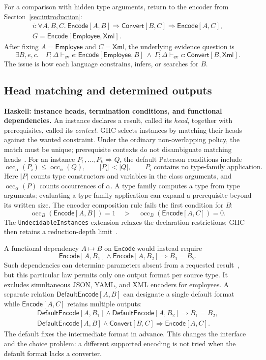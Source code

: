 \documentclass[10pt,a4paper]{article}
\newcommand{\Pj}[2]{\Gamma;\Delta\vdash_{\mathrm{ev}} #1:#2}
\newcommand{\kw}[1]{\mathsf{#1}}
\begin{document}
For a comparison with hidden type arguments, return to the encoder from
Section~\ref{sec:introduction}:
\[
\begin{gathered}
 i:\forall A,B,C.\ \kw{Encode}[A,B]\Rightarrow\kw{Convert}[B,C]
                    \Rightarrow\kw{Encode}[A,C],\\
 G=\kw{Encode}[\kw{Employee},\kw{Xml}].
\end{gathered}
\]
After fixing $A=\kw{Employee}$ and $C=\kw{Xml}$, the underlying evidence question is
\[
 \boxed{\exists B,e,c.\quad
 \Pj e{\kw{Encode}[\kw{Employee},B]}\ \land\ \Pj c{\kw{Convert}[B,\kw{Xml}]}.}
\]
The issue is how each language constrains, infers, or searches for $B$.

\subsection{Head matching and determined outputs}
\textbf{Haskell: instance heads, termination conditions, and functional dependencies.}
An instance declares a result, called its \emph{head}, together with prerequisites,
called its \emph{context}.
GHC selects instances by matching their heads against the wanted constraint.
Under the ordinary non-overlapping policy, the match must be unique; prerequisite
contexts do not disambiguate matching heads~\cite{ghc-termination}.
For an instance $P_1,\ldots,P_k\Longrightarrow Q$, the default Paterson conditions
include
\[
 \operatorname{occ}_\alpha(P_i)\le\operatorname{occ}_\alpha(Q),\qquad
 |P_i|<|Q|,\qquad
 P_i\text{ contains no type-family application}.
\]
Here $|P|$ counts type constructors and variables in the class arguments,
and $\operatorname{occ}_\alpha(P)$ counts occurrences of $\alpha$.
A type family computes a type from type arguments; evaluating a type-family
application can expand a prerequisite beyond its written size.
The encoder composition rule fails the first condition for $B$:
\[
 \operatorname{occ}_B(\kw{Encode}[A,B])=1
 \quad>\quad \operatorname{occ}_B(\kw{Encode}[A,C])=0.
\]
The \texttt{UndecidableInstances} extension relaxes the declaration restrictions;
GHC then retains a reduction-depth limit~\cite{ghc-termination}.

A functional dependency $A\mapsto B$ on $\kw{Encode}$ would instead require
\[
 \kw{Encode}[A,B_1]\land\kw{Encode}[A,B_2]\Longrightarrow B_1=B_2.
\]
Such dependencies can determine parameters absent from a requested
result~\cite{ghc-dependencies}, but this particular law permits only one output
format per source type. It excludes simultaneous JSON, YAML, and XML encoders
for employees. A separate relation $\kw{DefaultEncode}[A,B]$ can designate a
single default format while $\kw{Encode}[A,C]$ retains multiple outputs:
\[
\begin{gathered}
 \kw{DefaultEncode}[A,B_1]\land\kw{DefaultEncode}[A,B_2]\Longrightarrow B_1=B_2,\\
 \kw{DefaultEncode}[A,B]\land\kw{Convert}[B,C]\Longrightarrow\kw{Encode}[A,C].
\end{gathered}
\]
The default fixes the intermediate format in advance. This changes the interface
and the choice problem: a different supported encoding is not tried when the
default format lacks a converter.
\end{document}
